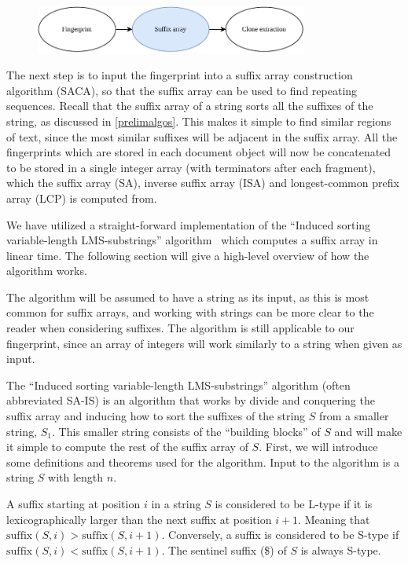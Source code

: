 \begin{figure}[H]
    \begin{center}
        \includegraphics[width=0.8\textwidth]{figures/phases/phases_suffix.drawio.pdf}
    \end{center}
\end{figure}

The next step is to input the fingerprint into a suffix array construction algorithm
(SACA), so that the suffix array can be used to find repeating sequences. Recall that the
suffix array of a string sorts all the suffixes of the string, as discussed in
\cref{prelimalgos}. This makes it simple to find similar regions of text, since the most
similar suffixes will be adjacent in the suffix array. All the fingerprints which are
stored in each document object will now be concatenated to be stored in a single integer
array (with terminators after each fragment), which the suffix array (SA), inverse suffix
array (ISA) and longest-common prefix array (LCP) is computed from.

We have utilized a straight-forward implementation of the ``Induced sorting
variable-length LMS-substrings'' algorithm~\cite{LinearTimeSuffixArraySAIS} which computes
a suffix array in linear time. The following section will give a high-level overview of
how the algorithm works. 

The algorithm will be assumed to have a string as its input, as this is most common for
suffix arrays, and working with strings can be more clear to the reader when considering
suffixes. The algorithm is still applicable to our fingerprint, since an array of integers
will work similarly to a string when given as input.

The ``Induced sorting variable-length LMS-substrings'' algorithm (often abbreviated SA-IS)
is an algorithm that works by divide and conquering the suffix array and inducing how to
sort the suffixes of the string $S$ from a smaller string, $S_1$. This smaller string
consists of the ``building blocks'' of $S$ and will make it simple to compute the rest of
the suffix array of $S$. First, we will introduce some definitions and theorems used for
the algorithm. Input to the algorithm is a string $S$ with length $n$. 

\begin{definition} A suffix starting at position $i$ in a
    string $S$ is considered to be L-type if it is lexicographically larger than the next
    suffix at position $i + 1$. Meaning that $\mathrm{suffix}(S, i) > \mathrm{suffix}(S,
    i+1)$. Conversely, a suffix is considered to be S-type if $\mathrm{suffix}(S, i) <
    \mathrm{suffix}(S, i+1)$. The sentinel suffix (\$) of $S$ is always S-type.
\end{definition}




